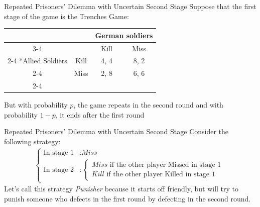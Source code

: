 \begin{frame}{Repeated Prisoners' Dilemma with Uncertain Second Stage}
  Suppose that the first stage of the game is the Trenches Game:
  \begin{table}[!h]
    \centering
    \begin{tabular}{*{4}{c|}}
      \multicolumn{2}{c}{} & \multicolumn{2}{c}{German soldiers} \\ \cline{3-4}
      \multicolumn{1}{c}{} &    & Kill & Miss \\ \cline{2-4}
      \multirow{2}*{Allied Soldiers} & Kill & 4, 4 & 8, 2 \\ \cline{2-4}
                         & Miss & 2, 8 & 6, 6 \\ \cline{2-4} 
    \end{tabular} 
  \end{table}
  But with probability $p$, the game repeats in the second round 
  and with probability $1-p$, it ends after the first round
\end{frame}

\begin{frame}{Repeated Prisoners' Dilemma with Uncertain Second Stage}
  Consider the following strategy: 
  \begin{align*}
    \begin{cases}
      \text{In stage } 1 & : \textit{Miss} \\ 
      \text{In stage } 2 & : 
      \begin{cases}
        \textit{Miss} \text{  if the other player Missed in stage 1} \\ 
        \textit{Kill} \text{  if the other player Killed in stage 1}
      \end{cases}
    \end{cases}
  \end{align*}
  Let's call this strategy \textit{Punisher} because it starts off friendly, 
  but will try to punish someone who defects in the first round by defecting in the second round.
\end{frame}

